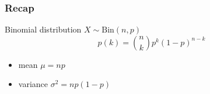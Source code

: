 \documentclass[slidestop,compress,mathserif]{beamer}
\begin{document}
\begin{frame}\frametitle{Recap}

Binomial distribution $X \sim \text{Bin}(n,p) $
\[ p(k) = {n \choose k} p^k(1-p)^{n-k}\]
\begin{itemize}
\item mean $\mu = np$
\item variance $\sigma^2 = np(1-p)$
\end{itemize}


\end{frame}


%
\end{document}
